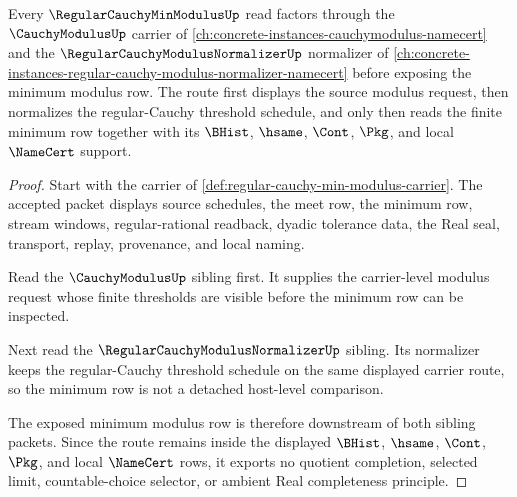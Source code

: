 \begin{theorem}
\label{thm:regular-cauchy-min-modulus-sibling-route}
Every $\RegularCauchyMinModulusUp$ read factors through the $\CauchyModulusUp$ carrier of \autoref{ch:concrete-instances-cauchymodulus-namecert} and the $\RegularCauchyModulusNormalizerUp$ normalizer of \autoref{ch:concrete-instances-regular-cauchy-modulus-normalizer-namecert} before exposing the minimum modulus row. The route first displays the source modulus request, then normalizes the regular-Cauchy threshold schedule, and only then reads the finite minimum row together with its $\BHist$, $\hsame$, $\Cont$, $\Pkg$, and local $\NameCert$ support.
\end{theorem}
\begin{proof}
Start with the carrier of \autoref{def:regular-cauchy-min-modulus-carrier}. The accepted packet displays source schedules, the meet row, the minimum row, stream windows, regular-rational readback, dyadic tolerance data, the Real seal, transport, replay, provenance, and local naming.

Read the $\CauchyModulusUp$ sibling first. It supplies the carrier-level modulus request whose finite thresholds are visible before the minimum row can be inspected.

Next read the $\RegularCauchyModulusNormalizerUp$ sibling. Its normalizer keeps the regular-Cauchy threshold schedule on the same displayed carrier route, so the minimum row is not a detached host-level comparison.

The exposed minimum modulus row is therefore downstream of both sibling packets. Since the route remains inside the displayed $\BHist$, $\hsame$, $\Cont$, $\Pkg$, and local $\NameCert$ rows, it exports no quotient completion, selected limit, countable-choice selector, or ambient Real completeness principle.
\end{proof}
